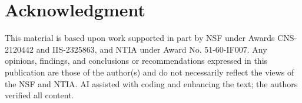 \documentclass[conference]{IEEEtran}
\begin{document}
\section*{Acknowledgment}
This material is based upon work supported in part by NSF under Awards CNS-2120442 and IIS-2325863, and NTIA under Award No. 51-60-IF007. Any opinions, findings, and conclusions or recommendations expressed in this publication are those of the author(s) and do not necessarily reflect the views of the NSF and NTIA. AI assisted with coding and enhancing the text; the authors verified all content.



\end{document}
